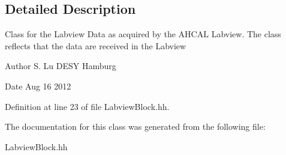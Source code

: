 \subsection{Detailed Description}
Class for the Labview Data as acquired by the AHCAL Labview. The class reflects that the data are received in the Labview \begin{DoxyAuthor}{Author}
S. Lu DESY Hamburg 
\end{DoxyAuthor}
\begin{DoxyDate}{Date}
Aug 16 2012 
\end{DoxyDate}


Definition at line 23 of file LabviewBlock.hh.

The documentation for this class was generated from the following file:\begin{DoxyCompactItemize}
\item 
LabviewBlock.hh\end{DoxyCompactItemize}
